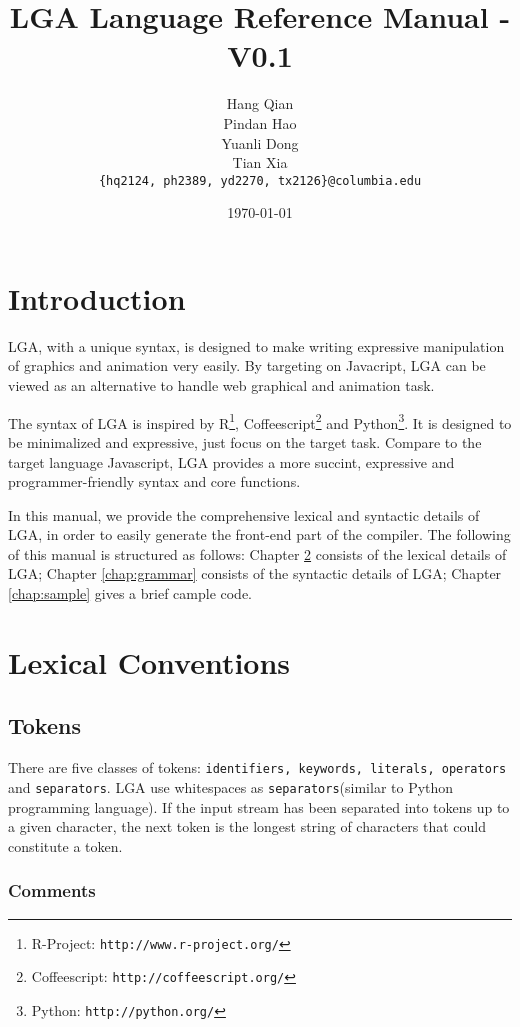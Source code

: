\documentclass[10pt]{report}
\title{\textbf{LGA Language Reference Manual - V0.1}}
\author{ Hang Qian \\ Pindan Hao \\ Yuanli Dong \\ Tian Xia \\ \texttt{\{hq2124, ph2389, yd2270, tx2126\}@columbia.edu}}
\date{\today}
\begin{document}
\maketitle
\tableofcontents

\newpage

\chapter{Introduction}
\label{chap:intro}

LGA, with a unique syntax, is designed to make writing expressive manipulation of graphics and animation very easily. By targeting on Javacript, LGA can be viewed as an alternative to handle web graphical and animation task. 

The syntax of LGA is inspired by R\footnote{R-Project: \texttt{http://www.r-project.org/}}, Coffeescript\footnote{Coffeescript: \texttt{http://coffeescript.org/}} and Python\footnote{Python: \texttt{http://python.org/}}. It is designed to be minimalized and expressive, just focus on the target task. Compare to the target language Javascript, LGA provides a more succint, expressive and programmer-friendly syntax and core functions.

In this manual, we provide the comprehensive lexical and syntactic details of LGA, in order to easily generate the front-end part of the compiler. The following of this manual is structured as follows: Chapter \ref{chap:lex} consists of the lexical details of LGA; Chapter \ref{chap:grammar} consists of the syntactic details of LGA; Chapter \ref{chap:sample} gives a brief cample code.

\chapter{Lexical Conventions}
\label{chap:lex}


\section{Tokens}
\label{sec:token}

There are five classes of tokens: \texttt{identifiers, keywords, literals, operators} and \texttt{separators}. LGA use whitespaces as \texttt{separators}(similar to Python programming language). If the input stream has been separated into tokens up to a given character, the next token is the longest string of characters that could constitute a token.

\subsection{Comments}
\label{sec:comments}
\end{document}
